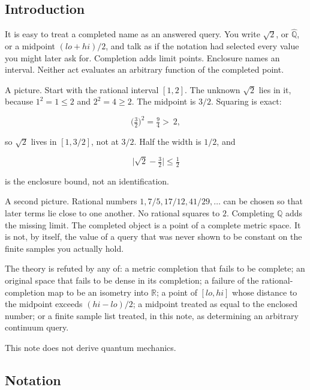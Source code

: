 \documentclass[
  11pt,
]{article}
\begin{document}
\subsection{Introduction}\label{introduction}

It is easy to treat a completed name as an answered query. You write \(\sqrt{2}\), or \(\widehat{\mathbb{Q}}\), or a midpoint \((lo+hi)/2\), and talk as if the notation had selected every value you might later ask for. Completion adds limit points. Enclosure names an interval. Neither act evaluates an arbitrary function of the completed point.

A picture. Start with the rational interval \([1,2]\). The unknown \(\sqrt{2}\) lies in it, because \(1^2=1\le 2\) and \(2^2=4\ge 2\). The midpoint is \(3/2\). Squaring is exact:

\[
\bigl(\tfrac{3}{2}\bigr)^2=\tfrac{9}{4}>\ 2,
\]

so \(\sqrt{2}\) lives in \([1,3/2]\), not at \(3/2\). Half the width is \(1/2\), and

\[
\bigl|\sqrt{2}-\tfrac{3}{2}\bigr|\le\tfrac12
\]

is the enclosure bound, not an identification.

A second picture. Rational numbers \(1, 7/5, 17/12, 41/29,\ldots\) can be chosen so that later terms lie close to one another. No rational squares to \(2\). Completing \(\mathbb{Q}\) adds the missing limit. The completed object is a point of a complete metric space. It is not, by itself, the value of a query that was never shown to be constant on the finite samples you actually hold.

The theory is refuted by any of: a metric completion that fails to be complete; an original space that fails to be dense in its completion; a failure of the rational-completion map to be an isometry into \(\mathbb{R}\); a point of \([lo,hi]\) whose distance to the midpoint exceeds \((hi-lo)/2\); a midpoint treated as equal to the enclosed number; or a finite sample list treated, in this note, as determining an arbitrary continuum query.

This note does not derive quantum mechanics.

\subsection{Notation}\label{notation}
\end{document}
